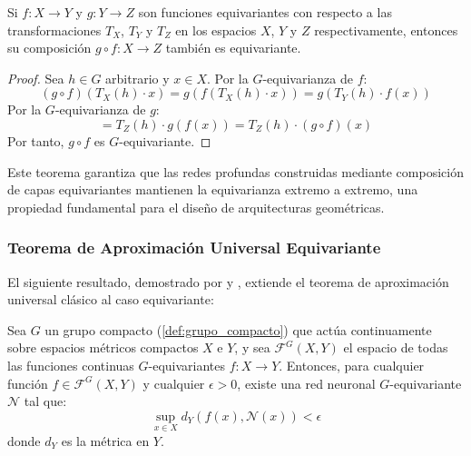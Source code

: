 \begin{theorem}\label{theorem:equivariant_composition}
Si $f: X \rightarrow Y$ y $g: Y \rightarrow Z$ son funciones equivariantes con respecto a las transformaciones $T_X$, $T_Y$ y $T_Z$ en los espacios $X$, $Y$ y $Z$ respectivamente, entonces su composición $g \circ f: X \rightarrow Z$ también es equivariante.
\end{theorem}

\begin{proof}
Sea $h \in G$ arbitrario y $x \in X$. Por la $G$-equivarianza de $f$:
\[
(g \circ f)(T_X(h) \cdot x) = g(f(T_X(h) \cdot x)) = g(T_Y(h) \cdot f(x))
\]
Por la $G$-equivarianza de $g$:
\[
= T_Z(h) \cdot g(f(x)) = T_Z(h) \cdot (g \circ f)(x)
\]
Por tanto, $g \circ f$ es $G$-equivariante.
\end{proof}

Este teorema garantiza que las redes profundas construidas mediante composición de capas equivariantes mantienen la equivarianza extremo a extremo, una propiedad fundamental para el diseño de arquitecturas geométricas.

\subsubsection{Teorema de Aproximación Universal Equivariante}\label{sec:teorema_equivariante}

El siguiente resultado, demostrado por \citet{yarotsky2022} y \citet{kondor2018generalizationconvolutionalneural}, extiende el teorema de aproximación universal clásico al caso equivariante:

\begin{theorem}\label{theorem:universal_approximation_equivariant}
Sea $G$ un grupo compacto (\autoref{def:grupo_compacto}) que actúa continuamente sobre espacios métricos compactos $X$ e $Y$, y sea $\mathcal{F}^G(X,Y)$ el espacio de todas las funciones continuas $G$-equivariantes $f: X \rightarrow Y$. Entonces, para cualquier función $f \in \mathcal{F}^G(X,Y)$ y cualquier $\epsilon > 0$, existe una red neuronal $G$-equivariante $\mathcal{N}$ tal que:
\begin{equation}
\sup_{x \in X} d_Y(f(x), \mathcal{N}(x)) < \epsilon
\label{eq:universal_approximation_equivariant}
\end{equation}
donde $d_Y$ es la métrica en $Y$.
\end{theorem}

